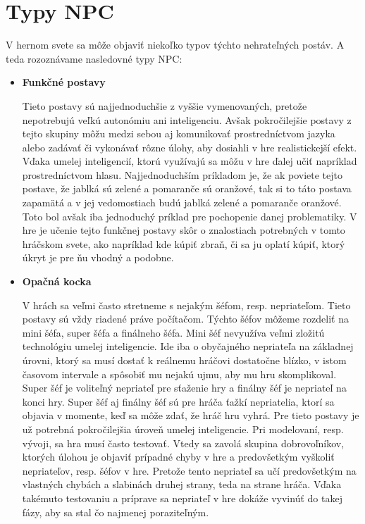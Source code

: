 \documentclass[10pt,twoside,slovak,a4paper]{article}
\begin{document}
\section{Typy NPC} 
\quad V hernom svete sa môže objaviť niekoľko typov týchto nehrateľných postáv. A teda rozoznávame nasledovné typy NPC:\cite{Types}
\begin{itemize}
\item \textbf{Funkčné postavy}

\quad Tieto postavy sú najjednoduchšie z vyššie vymenovaných, pretože nepotrebujú veľkú autonómiu ani inteligenciu. Avšak pokročilejšie postavy z tejto skupiny môžu medzi sebou aj komunikovať prostredníctvom jazyka alebo zadávať či vykonávať rôzne úlohy, aby dosiahli v hre realistickejší efekt. Vďaka umelej inteligencií, ktorú využívajú sa môžu v hre ďalej učiť napríklad prostredníctvom hlasu. Najjednoduchším príkladom je, že ak poviete tejto postave, že jablká sú zelené a pomaranče sú oranžové, tak si to táto postava zapamätá a v jej vedomostiach budú jablká zelené a pomaranče oranžové. Toto bol avšak iba jednoduchý príklad pre pochopenie danej problematiky. V hre je učenie tejto funkčnej postavy skôr o znalostiach potrebných v tomto hráčskom svete, ako napríklad kde kúpiť zbraň, či sa ju oplatí kúpiť, ktorý úkryt je pre ňu vhodný a podobne. 


\item \textbf{Opačná kocka}

\quad V hrách sa veľmi často stretneme s nejakým šéfom, resp. nepriateľom. Tieto postavy sú vždy riadené práve počítačom. Týchto šéfov môžeme rozdeliť na mini šéfa, super šéfa a finálneho šéfa. Mini šéf nevyužíva veľmi zložitú technológiu umelej inteligencie. Ide iba o obyčajného nepriateľa na základnej úrovni, ktorý sa musí dostať k reálnemu hráčovi dostatočne blízko, v istom časovom intervale a spôsobiť mu nejakú ujmu, aby mu hru skomplikoval. Super šéf je voliteľný nepriateľ pre sťaženie hry a finálny šéf je nepriateľ na konci hry. Super šéf aj finálny šéf sú pre hráča ťažkí nepriatelia, ktorí sa objavia v momente, keď sa môže zdať, že hráč hru vyhrá. Pre tieto postavy je už potrebná pokročilejšia úroveň umelej inteligencie. Pri modelovaní, resp. vývoji, sa hra musí často testovať. Vtedy sa zavolá skupina dobrovoľníkov, ktorých úlohou je objaviť prípadné chyby v hre a predovšetkým vyškoliť nepriateľov, resp. šéfov v hre. Pretože tento nepriateľ sa učí predovšetkým na vlastných chybách a slabinách druhej strany, teda na strane hráča. Vďaka takémuto testovaniu a príprave sa nepriateľ v hre dokáže vyvinúť do takej fázy, aby sa stal čo najmenej poraziteľným. 


\end{itemize}
\end{document}
